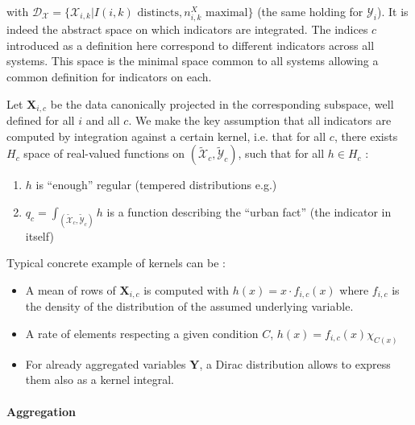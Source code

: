 \documentclass[runningheads,a4paper]{llncs2e/llncs}
\begin{document}
with $\mathcal{D}_{\mathcal{X}}=\{\mathcal{X}_{i,k}|I(i,k)\textrm{ distincts},n_{i,k}^{X}\mbox{ maximal}\}$
(the same holding for $\mathcal{Y}_{i}$). It is indeed the abstract space on which indicators are integrated. The indices $c$ introduced as a definition here correspond to different indicators across all systems. This space is the minimal space common to all systems allowing a common definition for indicators on each.


Let $\mathbf{X}_{i,c}$ be the data canonically projected in the corresponding subspace, well defined for all $i$ and all $c$. We make the key assumption that all indicators are computed by integration against a certain kernel, i.e. that for all $c$, there exists $H_{c}$ space of real-valued functions on $(\tilde{\mathcal{X}}_{c},\tilde{\mathcal{Y}}_{c})$, such that for all $h\in H_{c}$ :
\begin{enumerate}
\item $h$ is ``enough'' regular (tempered distributions e.g.)
\item $q_c=\int_{(\tilde{\mathcal{X}}_{c},\tilde{\mathcal{Y}}_{c})}h$ is a function describing the ``urban fact'' (the indicator in itself)
\end{enumerate}

Typical concrete example of kernels can be :

\begin{itemize}
\item A mean of rows of $\mathbf{X}_{i,c}$ is computed with $h(x)=x\cdot f_{i,c}(x)$ where $f_{i,c}$ is the density of the distribution of the assumed underlying variable.
\item A rate of elements respecting a given condition $C$, $h(x)=f_{i,c}(x)\chi_{C(x)}$ 
\item For already aggregated variables $\mathbf{Y}$, a Dirac distribution allows to express them also as a kernel integral. 
\end{itemize}


\paragraph{Aggregation}
\end{document}
